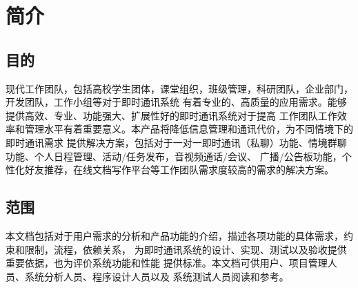 \chapter{简介}
\section{目的}


现代工作团队，包括高校学生团体，课堂组织，班级管理，科研团队，企业部门，开发团队，工作小组等对于即时通讯系统
有着专业的、高质量的应用需求。能够提供高效、专业、功能强大、扩展性好的即时通讯系统对于提高
工作团队工作效率和管理水平有着重要意义。本产品将降低信息管理和通讯代价，为不同情境下的即时通讯需求
提供解决方案，包括对于一对一即时通讯（私聊）功能、情境群聊功能、个人日程管理、活动/任务发布，音视频通话/会议、
广播/公告板功能，个性化好友推荐，在线文档写作平台等工作团队需求度较高的需求的解决方案。

\section{范围}

    本文档包括对于用户需求的分析和产品功能的介绍，描述各项功能的具体需求，约束和限制，流程，依赖关系，
    为即时通讯系统的设计、实现、测试以及验收提供重要依据，也为评价系统功能和性能
    提供标准。本文档可供用户、项目管理人员、系统分析人员、程序设计人员以及
    系统测试人员阅读和参考。
